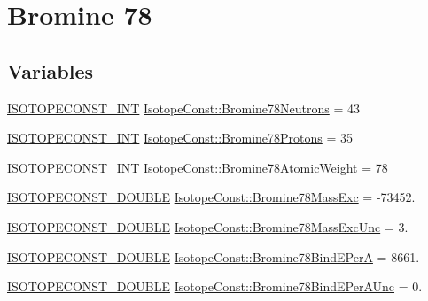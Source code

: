 \hypertarget{group___isotope_const-_bromine-_br78}{}\section{Bromine 78}
\label{group___isotope_const-_bromine-_br78}
\subsection*{Variables}
\begin{DoxyCompactItemize}
\item 
\mbox{\hyperlink{group___isotope_const-_macros_ga5f18360b3e99483a35c32d789e62621c}{I\+S\+O\+T\+O\+P\+E\+C\+O\+N\+S\+T\+\_\+\+I\+NT}} \mbox{\hyperlink{group___isotope_const-_bromine-_br78_ga6197a51594150d9b354236b0b919bc49}{Isotope\+Const\+::\+Bromine78\+Neutrons}} = 43
\item 
\mbox{\hyperlink{group___isotope_const-_macros_ga5f18360b3e99483a35c32d789e62621c}{I\+S\+O\+T\+O\+P\+E\+C\+O\+N\+S\+T\+\_\+\+I\+NT}} \mbox{\hyperlink{group___isotope_const-_bromine-_br78_ga4a999740b3e5da170592473a805773bc}{Isotope\+Const\+::\+Bromine78\+Protons}} = 35
\item 
\mbox{\hyperlink{group___isotope_const-_macros_ga5f18360b3e99483a35c32d789e62621c}{I\+S\+O\+T\+O\+P\+E\+C\+O\+N\+S\+T\+\_\+\+I\+NT}} \mbox{\hyperlink{group___isotope_const-_bromine-_br78_ga6c7615ffaca96ec3e45e514c57300cc6}{Isotope\+Const\+::\+Bromine78\+Atomic\+Weight}} = 78
\item 
\mbox{\hyperlink{group___isotope_const-_macros_ga8f45a7272ce02c0b4c65c44636ed719a}{I\+S\+O\+T\+O\+P\+E\+C\+O\+N\+S\+T\+\_\+\+D\+O\+U\+B\+LE}} \mbox{\hyperlink{group___isotope_const-_bromine-_br78_ga63a7bde04aa8751da3a734dae041de24}{Isotope\+Const\+::\+Bromine78\+Mass\+Exc}} = -\/73452.
\item 
\mbox{\hyperlink{group___isotope_const-_macros_ga8f45a7272ce02c0b4c65c44636ed719a}{I\+S\+O\+T\+O\+P\+E\+C\+O\+N\+S\+T\+\_\+\+D\+O\+U\+B\+LE}} \mbox{\hyperlink{group___isotope_const-_bromine-_br78_ga41b9226f53c00e393574f0e2b51034e1}{Isotope\+Const\+::\+Bromine78\+Mass\+Exc\+Unc}} = 3.
\item 
\mbox{\hyperlink{group___isotope_const-_macros_ga8f45a7272ce02c0b4c65c44636ed719a}{I\+S\+O\+T\+O\+P\+E\+C\+O\+N\+S\+T\+\_\+\+D\+O\+U\+B\+LE}} \mbox{\hyperlink{group___isotope_const-_bromine-_br78_gaf0fd59933543f0bf07255128687aeab3}{Isotope\+Const\+::\+Bromine78\+Bind\+E\+PerA}} = 8661.
\item 
\mbox{\hyperlink{group___isotope_const-_macros_ga8f45a7272ce02c0b4c65c44636ed719a}{I\+S\+O\+T\+O\+P\+E\+C\+O\+N\+S\+T\+\_\+\+D\+O\+U\+B\+LE}} \mbox{\hyperlink{group___isotope_const-_bromine-_br78_ga7fe8390f1fa49f57e8ccd222c92aa94f}{Isotope\+Const\+::\+Bromine78\+Bind\+E\+Per\+A\+Unc}} = 0.

\end{DoxyCompactItemize}
